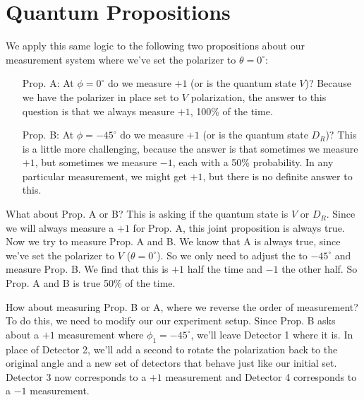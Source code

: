 \section{Quantum Propositions}
\label{sec:quantprop}
We apply this same logic to the following two propositions about our measurement system where we've set the polarizer to $\theta = 0^\circ$:
\begin{itemize}
\item[Prop. A:] At $\phi=0^\circ$ do we measure ${+1}$ (or is the quantum state $V$)? Because we have the polarizer in place set to $V$ polarization, the answer to this question is that we always measure $+1$, 100\% of the time.
\item[Prop. B:] At $\phi=-45^\circ$ do we measure ${+1}$ (or is the quantum state $D_R$)? This is a little more challenging, because the answer is that sometimes we measure ${+1}$, but sometimes we measure ${-1}$, each with a 50\% probability. In any particular measurement, we might get ${+1}$, but there is no definite answer to this.
\end{itemize}
What about Prop. A or B? This is asking if the quantum state is $V$ or $D_R$. Since we will always measure a ${+1}$ for Prop. A, this joint proposition is always true. Now we try to measure Prop. A and B. We know that A is always true, since we've set the polarizer to $V$ ($\theta=0^\circ$). So we only need to adjust the \hwp to $-45^\circ$ and measure Prop. B. We find that this is ${+1}$ half the time and ${-1}$ the other half. So Prop. A and B is true 50\% of the time.

How about measuring Prop. B or A, where we reverse the order of measurement? To do this, we need to modify our  our experiment setup. Since Prop. B asks about a ${+1}$ measurement where $\phi_1=-45^\circ$, we'll leave Detector 1 where it is. In place of Detector 2, we'll add a second \hwp to rotate the polarization back to the original angle and a new set of detectors that behave just like our initial set. Detector 3 now corresponds to a ${+1}$ measurement and Detector 4 corresponds to a ${-1}$ measurement.

